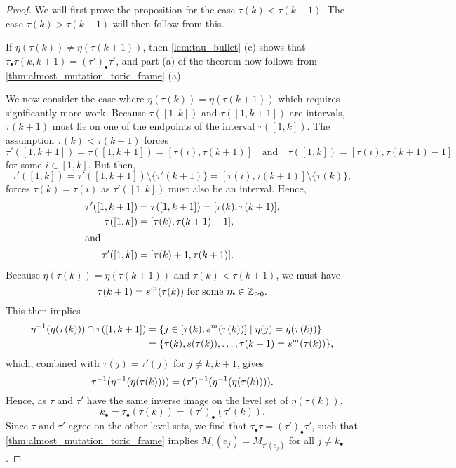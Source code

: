 \begin{proof}

	We will first prove the proposition for the case $\tau(k) < \tau(k+1)$. The case
	$\tau(k) > \tau(k+1)$ will then follow from this.

	If $\eta(\tau(k)) \neq \eta(\tau(k+1))$, then \cref{lem:tau_bullet} (c) shows that
	$\tau_\bullet \tau (k, k+1) = (\tau')_\bullet \tau'$, and part (a) of the theorem now
	follows from \cref{thm:almost_mutation_toric_frame} (a).

	We now consider the case where $\eta(\tau(k)) = \eta(\tau(k+1))$ which requires
	significantly more work. Because $\tau([1, k])$ and $\tau([1, k+1])$ are intervals,
	$\tau(k+1)$ must lie on one of the endpoints of the interval $\tau([1, k])$. The
	assumption $\tau(k) < \tau(k+1)$ forces
	\begin{equation*}
		\tau'([1, k+1]) = \tau([1, k+1]) = [\tau(i), \tau(k+1)] \quad \text{and}\quad \tau([1, k]) = [\tau(i), \tau(k+1) - 1]
	\end{equation*}
	for some $i\in [1, k]$. But then,
	\begin{equation*}
		\tau'([1, k]) = \tau'([1, k+1])\setminus\{\tau'(k+1)\} = [\tau(i), \tau(k+1)] \setminus \{\tau(k)\},
	\end{equation*}
	forces $\tau(k) = \tau(i)$ as $\tau'([1, k])$ must also be an interval. Hence,
	\begin{align*}
		\tau'([1, k+1]) & = \tau([1, k+1]) = [\tau(k), \tau(k+1)], \\
		\tau([1, k])    & = [\tau(k), \tau(k+1) - 1],              \\
		\shortintertext{and}
		\tau'([1, k])   & = [\tau(k) + 1, \tau(k+1)].
	\end{align*}
	Because $\eta(\tau(k)) = \eta(\tau(k+1))$ and $\tau(k) < \tau(k+1)$, we must have
	\begin{equation*}
		\tau(k+1) = s^m(\tau(k)) \text{ for some } m \in \mathbb{Z}_{\geq 0}.
	\end{equation*}
	This then implies
	\begin{equation}\label{eq:level_set_tau_k}
		\begin{aligned}
			\eta^{-1}(\eta(\tau(k))) \cap \tau([1, k+1])
			 & = \{j \in [\tau(k), s^m(\tau(k))] \mid \eta(j) = \eta(\tau(k))\} \\
			 & = \{\tau(k), s(\tau(k)), \dots, \tau(k+1) = s^m(\tau(k))\},
		\end{aligned}
	\end{equation}
	which, combined with $\tau(j) = \tau'(j)$ for $j\neq k, k+1$, gives
	\begin{equation*}
		\tau^{-1}(\eta^{-1}(\eta(\tau(k)))) = (\tau')^{-1}(\eta^{-1}(\eta(\tau(k)))).
	\end{equation*}
	Hence, as $\tau$ and $\tau'$ have the same inverse image on the level set of
	$\eta(\tau(k))$,
	\begin{equation*}
		k_\bullet = \tau_\bullet(\tau(k)) = (\tau')_\bullet(\tau'(k)).
	\end{equation*}
	Since $\tau$ and $\tau'$ agree on the other level sets, we find that $\tau_\bullet \tau
		= (\tau')_\bullet \tau'$, such that \cref{thm:almost_mutation_toric_frame} implies
	$M_\tau(e_j) = M_{\tau'(e_j)}$ for all $j \neq k_\bullet$.


\end{proof}
